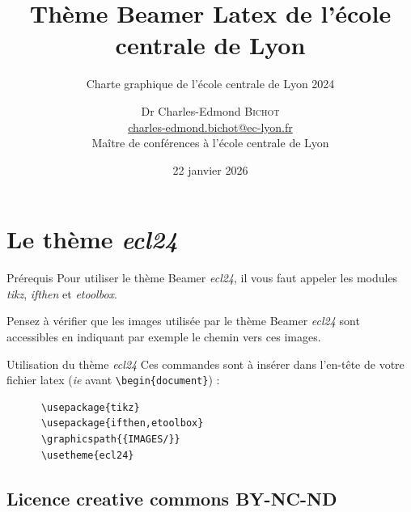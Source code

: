 \documentclass[9pt]{beamer}
\begin{document}
\title{Thème Beamer Latex de l'école centrale de Lyon}
\subtitle{Charte graphique de l'école centrale de Lyon 2024}
\author[Dr Charles-Edmond \textsc{Bichot}]{Dr Charles-Edmond \textsc{Bichot}\\\href{mailto:charles-edmond.bichot@ec-lyon.fr}{charles-edmond.bichot@ec-lyon.fr}\\Maître de conférences à l'école centrale de Lyon} %
\date{22 janvier 2026}

\maketitle

\section{Le thème \emph{ecl24}}

\begin{frame}[fragile]{\insertsection} %
  \begin{alertblock}{Prérequis}
    Pour utiliser le thème Beamer \emph{ecl24}, il vous faut appeler les modules \emph{tikz}, \emph{ifthen} et \emph{etoolbox}.

    Pensez à vérifier que les images utilisée par le thème Beamer \emph{ecl24} sont accessibles en indiquant par exemple le chemin vers ces images.
  \end{alertblock}

  \begin{exampleblock}{Utilisation du thème \emph{ecl24}}
    Ces commandes sont à insérer dans l'en-tête de votre fichier latex (\emph{ie} avant \verb+\begin{document}+) :
    \begin{verbatim}
      \usepackage{tikz}     
      \usepackage{ifthen,etoolbox}
      \graphicspath{{IMAGES/}}
      \usetheme{ecl24}
    \end{verbatim}
  \end{exampleblock}
\end{frame}


\subsection{Licence creative commons BY-NC-ND}
\end{document}
